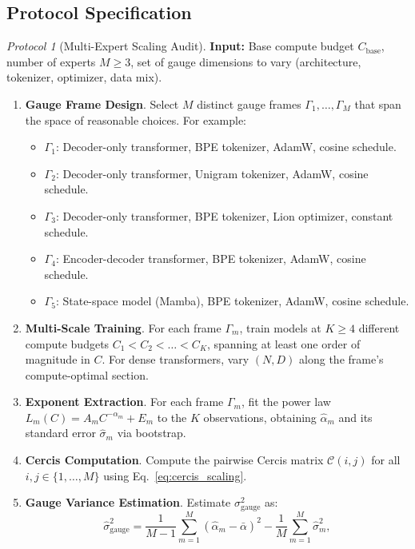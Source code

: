 \documentclass[12pt,a4paper]{article}
\theoremstyle{remark}
\newtheorem{protocol}[theorem]{Protocol}
\newcommand{\cercis}{\mathcal{C}}
\newcommand{\Loss}{L}
\begin{document}
\subsection{Protocol Specification}

\begin{protocol}[Multi-Expert Scaling Audit]
\label{prot:audit}
\textbf{Input:} Base compute budget $C_{\text{base}}$, number of experts $M \geq 3$, set of gauge dimensions to vary (architecture, tokenizer, optimizer, data mix).
\begin{enumerate}[label=Step \arabic*:, leftmargin=*]
    \item \textbf{Gauge Frame Design}. Select $M$ distinct gauge frames $\Gamma_1, \dots, \Gamma_M$ that span the space of reasonable choices. For example:
    \begin{itemize}
        \item $\Gamma_1$: Decoder-only transformer, BPE tokenizer, AdamW, cosine schedule.
        \item $\Gamma_2$: Decoder-only transformer, Unigram tokenizer, AdamW, cosine schedule.
        \item $\Gamma_3$: Decoder-only transformer, BPE tokenizer, Lion optimizer, constant schedule.
        \item $\Gamma_4$: Encoder-decoder transformer, BPE tokenizer, AdamW, cosine schedule.
        \item $\Gamma_5$: State-space model (Mamba), BPE tokenizer, AdamW, cosine schedule.
    \end{itemize}
    \item \textbf{Multi-Scale Training}. For each frame $\Gamma_m$, train models at $K \geq 4$ different compute budgets $C_1 < C_2 < \dots < C_K$, spanning at least one order of magnitude in $C$. For dense transformers, vary $(N, D)$ along the frame's compute-optimal section.
    \item \textbf{Exponent Extraction}. For each frame $\Gamma_m$, fit the power law $\Loss_m(C) = A_m C^{-\alpha_m} + E_m$ to the $K$ observations, obtaining $\hat{\alpha}_m$ and its standard error $\hat{\sigma}_m$ via bootstrap.
    \item \textbf{Cercis Computation}. Compute the pairwise Cercis matrix $\cercis(i, j)$ for all $i, j \in \{1, \dots, M\}$ using Eq.~\eqref{eq:cercis_scaling}.
    \item \textbf{Gauge Variance Estimation}. Estimate $\sigma^2_{\text{gauge}}$ as:
    \begin{equation}
    \hat{\sigma}^2_{\text{gauge}} = \frac{1}{M-1} \sum_{m=1}^M (\hat{\alpha}_m - \bar{\alpha})^2 - \frac{1}{M} \sum_{m=1}^M \hat{\sigma}^2_m,

\end{equation}
\end{enumerate}
\end{protocol}
\end{document}
